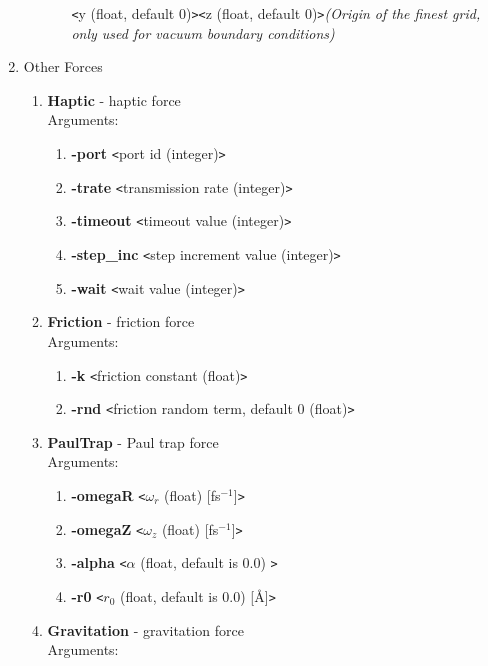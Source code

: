 \documentclass[11pt]{report}
\newcommand{\tempstart}{\texttt{<}}
\newcommand{\tempend}{\texttt{>}}
\begin{document}
\begin{enumerate}
\begin{enumerate}
\begin{enumerate}
\tempstart y (float, default 0)\tempend  \tempstart z (float, default 0)\tempend  {\it (Origin of the finest    grid, only used for vacuum boundary conditions)}
    \end{enumerate}
  \end{enumerate}
\item Other Forces
  \begin{enumerate}
  \item {\bf Haptic} - haptic force\\
    Arguments:
    \begin{enumerate}
    \item {\bf -port} \tempstart port id (integer)\tempend 
    \item {\bf -trate} \tempstart transmission rate (integer)\tempend 
    \item {\bf -timeout} \tempstart timeout value (integer)\tempend 
    \item {\bf -step\_inc} \tempstart step increment value (integer)\tempend 
    \item {\bf -wait} \tempstart wait value (integer)\tempend 
    \end{enumerate}
  \item {\bf Friction} - friction force\\
    Arguments:
    \begin{enumerate}
    \item {\bf -k} \tempstart friction constant (float)\tempend 
    \item {\bf -rnd} \tempstart friction random term, default 0 (float)\tempend 
    \end{enumerate}
  \item {\bf PaulTrap} - Paul trap force\cite{HaAv91,Schi93}\\
    Arguments:
    \begin{enumerate}
    \item {\bf -omegaR} \tempstart $\omega _r$ (float) [fs$^{-1}$]\tempend 
    \item {\bf -omegaZ} \tempstart $\omega _z$ (float) [fs$^{-1}$]\tempend 
    \item {\bf -alpha}  \tempstart $\alpha$    (float, default is 0.0) \tempend 
    \item {\bf -r0}     \tempstart $r_0$ (float, default is 0.0) [\AA ]\tempend 
  \end{enumerate}
  \item {\bf Gravitation} - gravitation force \\
    Arguments:
    \begin{enumerate}

\end{enumerate}
\end{enumerate}
\end{enumerate}
\end{document}
